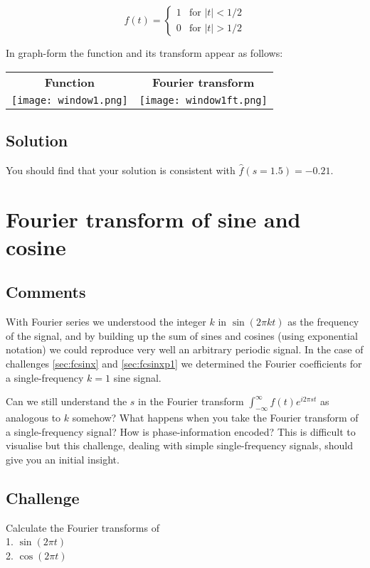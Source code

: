 \begin{equation}
    f(t)=
    \begin{cases}
        1 & \text{for } |t| < 1/2 \\
        0 & \text{for } |t| > 1/2
    \end{cases}
\end{equation}

In graph-form the function and its transform appear as follows:

\begin{tabular}{cc}
    \textbf{Function} & \textbf{Fourier transform} \\
    \texttt{[image: window1.png]} & \texttt{[image: window1ft.png]}
\end{tabular}

\subsection*{Solution}
You should find that your solution is consistent with $\hat{f}(s=1.5)=-0.21$.




\newpage
\section{Fourier transform of sine and cosine}

\subsection*{Comments}
With Fourier series we understood the integer $k$ in $\sin(2 \pi k t)$ as the frequency of the signal, and by building up the sum of sines and cosines (using exponential notation) we could reproduce very well an arbitrary periodic signal. In the case of challenges \ref{sec:fcsinx} and \ref{sec:fcsinxp1} we determined the Fourier coefficients for a single-frequency $k=1$ sine signal.

Can we still understand the $s$ in the Fourier transform $\int_{-\infty}^{\infty} f(t) e^{i 2 \pi s t}$ as analogous to $k$ somehow? What happens when you take the Fourier transform of a single-frequency signal? How is phase-information encoded? This is difficult to visualise but this challenge, dealing with simple single-frequency signals, should give you an initial insight.

\subsection*{Challenge}
Calculate the Fourier transforms of\\
1. $\sin(2 \pi t)$\\
2. $\cos(2 \pi t)$

